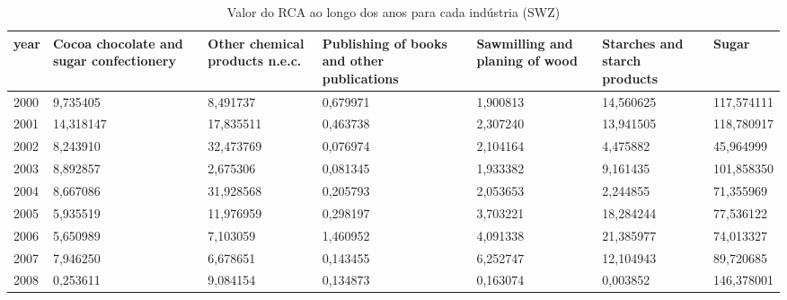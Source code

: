 \begin{table}
\centering
\caption{Valor do RCA ao longo dos anos para cada indústria (SWZ)}
\begin{tabular}{p{1cm}p{2cm}p{2cm}p{2cm}p{2cm}p{2cm}p{2cm}}
\toprule
 year &  Cocoa chocolate and sugar confectionery &  Other chemical products n.e.c. &  Publishing of books and other publications &  Sawmilling and planing of wood &  Starches and starch products &      Sugar \\
\midrule
 2000 &                                 9,735405 &                        8,491737 &                                    0,679971 &                        1,900813 &                     14,560625 & 117,574111 \\
 2001 &                                14,318147 &                       17,835511 &                                    0,463738 &                        2,307240 &                     13,941505 & 118,780917 \\
 2002 &                                 8,243910 &                       32,473769 &                                    0,076974 &                        2,104164 &                      4,475882 &  45,964999 \\
 2003 &                                 8,892857 &                        2,675306 &                                    0,081345 &                        1,933382 &                      9,161435 & 101,858350 \\
 2004 &                                 8,667086 &                       31,928568 &                                    0,205793 &                        2,053653 &                      2,244855 &  71,355969 \\
 2005 &                                 5,935519 &                       11,976959 &                                    0,298197 &                        3,703221 &                     18,284244 &  77,536122 \\
 2006 &                                 5,650989 &                        7,103059 &                                    1,460952 &                        4,091338 &                     21,385977 &  74,013327 \\
 2007 &                                 7,946250 &                        6,678651 &                                    0,143455 &                        6,252747 &                     12,104943 &  89,720685 \\
 2008 &                                 0,253611 &                        9,084154 &                                    0,134873 &                        0,163074 &                      0,003852 & 146,378001 \\

\end{tabular}
\end{table}
